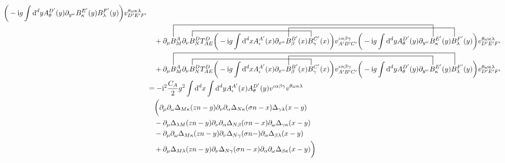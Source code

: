\begin{align}
	\bigg(-\imag g \int \ddx yA_\theta^{D'}(y) \partial_{y^\omega} B_\kappa^{E'} (y) B_\lambda^{F'}(y) \bigg) v^{\theta\omega\kappa\lambda}_{D'E'F'}
	\nl
	+\contraction[4ex]{\partial_\mu }{B}{_M^{A}  \partial_\nu B_N^D T^D_{AE} \bigg(-\imag g \int \ddx xA_\iota^{A'}(x) \partial_{x^\alpha} B_\beta^{B'} (x) B_\gamma^{C'}(x) \bigg) v^{\iota \alpha\beta\gamma}_{A'B'C'}
		\bigg(-\imag g \int \ddx yA_\theta^{D'}(y) \partial_{y^\omega} }{B}
	\contraction[2ex]{\partial_\mu B_M^{A}  \partial_\nu }{B}{_N^D T^D_{AE} \bigg(-\imag g \int \ddx xA_\iota^{A'}(x) \partial_{x^\alpha} B_\beta^{B'} (x) }{B}
	\contraction[3ex]{\partial_\mu B_M^{A}  \partial_\nu B_N^D T^D_{AE} \bigg(-\imag g \int \ddx xA_\iota^{A'}(x) \partial_{x^\alpha}}{B}{_\beta^{B'} (x) B_\gamma^{C'}(x) \bigg) v^{\iota \alpha\beta\gamma}_{A'B'C'}
		\bigg(-\imag g \int \ddx yA_\theta^{D'}(y) \partial_{y^\omega} B_\kappa^{E'} (y) }{B}
	\partial_\mu B_M^{A}  \partial_\nu B_N^D T^D_{AE} \bigg(-\imag g \int \ddx xA_\iota^{A'}(x) \partial_{x^\alpha} B_\beta^{B'} (x) B_\gamma^{C'}(x) \bigg) v^{\iota \alpha\beta\gamma}_{A'B'C'}
	\bigg(-\imag g \int \ddx yA_\theta^{D'}(y) \partial_{y^\omega} B_\kappa^{E'} (y) B_\lambda^{F'}(y) \bigg) v^{\theta\omega\kappa\lambda}_{D'E'F'}
	\nl
	+\contraction[4ex]{\partial_\mu }{B}{_M^{A}  \partial_\nu B_N^D T^D_{AE} \bigg(-\imag g \int \ddx xA_\iota^{A'}(x) \partial_{x^\alpha} B_\beta^{B'} (x) B_\gamma^{C'}(x) \bigg) v^{\iota \alpha\beta\gamma}_{A'B'C'}
		\bigg(-\imag g \int \ddx yA_\theta^{D'}(y) \partial_{y^\omega} B_\omega^{E'} (y) }{B}
	\contraction[2ex]{\partial_\mu B_M^{A}  \partial_\nu }{B}{_N^D T^D_{AE} \bigg(-\imag g \int \ddx xA_\iota^{A'}(x) \partial_{x^\alpha} B_\beta^{B'} (x) }{B}
	\contraction[3ex]{\partial_\mu B_M^{A}  \partial_\nu B_N^D T^D_{AE} \bigg(-\imag g \int \ddx xA_\iota^{A'}(x) \partial_{x^\alpha}}{B}{_\beta^{B'} (x) B_\gamma^{C'}(x) \bigg) v^{\iota \alpha\beta\gamma}_{A'B'C'}
		\bigg(-\imag g \int \ddx yA_\theta^{D'}(y) \partial_{y^\omega}}{B}
	\partial_\mu B_M^{A}  \partial_\nu B_N^D T^D_{AE} \bigg(-\imag g \int \ddx xA_\iota^{A'}(x) \partial_{x^\alpha} B_\beta^{B'} (x) B_\gamma^{C'}(x) \bigg) v^{\iota \alpha\beta\gamma}_{A'B'C'}
	\bigg(-\imag g \int \ddx yA_\theta^{D'}(y) \partial_{y^\omega} B_\kappa^{E'} (y) B_\lambda^{F'}(y) \bigg) v^{\theta\omega\kappa\lambda}_{D'E'F'}
	\\
	&=-\imag^2 \frac{C_A}{2}g^2 \int \ddx x \int \ddx y A^{A'}_\iota(x) A^{D'}_\theta(y) v^{\iota\alpha\beta\gamma}v^{\theta\omega\kappa\lambda}
	\nl \bigg( \partial_\mu \partial_\omega \propagator_{M\kappa}(zn-y) \partial_\nu \partial_\alpha\propagator_{N\kappa}(\sigma n-x)\propagator_{\gamma\lambda}(x-y)
	\nl
	- \partial_\mu \propagator_{\lambda M}(zn-y) \partial_\nu \partial_\alpha\propagator_{N\beta}(\sigma n-x) \partial_\omega\propagator_{\gamma\kappa}(x-y)
	\nl
	-\partial_\mu\partial_\omega \propagator_{M\kappa}(zn-y) \partial_\nu \propagator_{N\gamma}(\sigma n -) \partial_\alpha \propagator_{\beta\lambda}(x-y)
	\nl
	+\partial_\mu \propagator_{M\lambda}(zn-y)\partial_\nu\propagator_{N\gamma}(\sigma n -x) \partial_\alpha\partial_\omega\propagator_{\beta \kappa} (x-y) \bigg)
\end{align}
